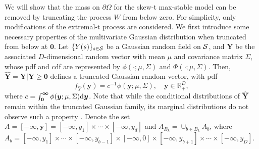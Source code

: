 \documentclass[lineno]{biometrika}
\begin{document}
We will show that the mass on $\partial\Omega$ for the skew-t max-stable model can be removed by truncating the process $W$ from below zero.
For simplicity, only modifications of the extremal-t process are considered. We first introduce some necessary properties of the multivariate Gaussian distribution when truncated from below at $\bm 0$. Let $\{Y(s)\}_{s\in{\mathcal{S}}}$ be a Gaussian random field on ${\mathcal{S}}$, and $\bm Y$ be the associated $D$-dimensional random vector with mean $\mu$ and covariance matrix $\Sigma$, whose pdf and cdf are represented by $\phi(\cdot;\mu,\Sigma)$ and $\Phi(\cdot;\mu,\Sigma)$. Then, $\hat{\bm Y} = \bm Y| \bm Y\geq \bm 0$ defines a truncated Gaussian random vector, with pdf 
 $$f_{\hat Y}(\bm y) = c^{-1} \phi(\bm y;\mu,\Sigma), \quad \bm y \in \mathbb{R}^D_+,$$
 where $c=\int_{\bm 0}^{\bm \infty} \phi(\bm y;\mu,\Sigma)\text d \bm y$. 
Note that while the conditional distributions of $\hat{\bm Y}$ remain within the truncated Gaussian family, its marginal distributions do not observe such a property \citep{Horrace:2005}.
%
Denote the set $A = [-\bm \infty, \bm y] = [-\infty,y_1]\times\cdots\times[-\infty,y_d] $ and 
$A_{B_k} = \cup_{b\in B_k} A_b$, where $A_b = [-\infty,y_1]\times\cdots\times[-\infty,y_{b-1}]\times[-\infty,0]\times[-\infty,y_{b+1}]\times\cdots\times[-\infty,y_D]$.
\end{document}
